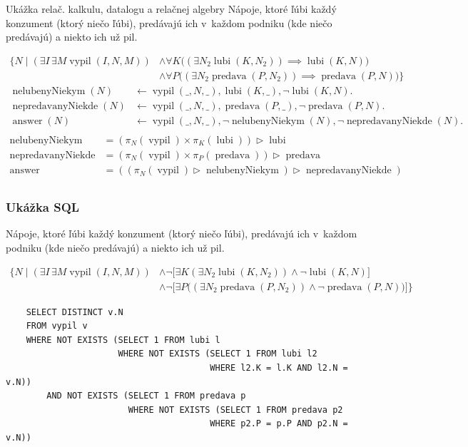 \documentclass[12pt]{beamer}
\DeclareMathOperator{\antijoin}{\rhd}
\DeclareMathOperator{\lubi}{lubi}
\DeclareMathOperator{\predava}{predava}
\DeclareMathOperator{\vypil}{vypil}
\DeclareMathOperator{\answer}{answer}
\begin{document}
\begin{frame}{Ukážka relač. kalkulu, datalogu a relačnej algebry}
Nápoje, ktoré ľúbi každý konzument (ktorý niečo ľúbi), predávajú ich v~každom podniku (kde niečo predávajú) a niekto ich už pil.

{\scriptsize
\begin{align*}
\Big\{N\mid (\exists I\,\exists M\vypil(I, N, M))&\land \forall K \Big( (\exists N_2\lubi(K, N_2))\implies \lubi(K, N)\Big)\\
&\land \forall P \Big((\exists N_2 \predava(P, N_2))\implies \predava(P, N)\Big)\Big\}
\end{align*}
}
{\scriptsize
\begin{align*}
\operatorname{nelubenyNiekym}(N) &\leftarrow \vypil(\_, N, \_), \lubi(K, \_), \lnot\lubi(K, N).\\
\operatorname{nepredavanyNiekde}(N) &\leftarrow \vypil(\_, N, \_), \predava(P, \_), \lnot\predava(P, N).\\
\answer(N) &\leftarrow \vypil(\_, N, \_), \lnot\operatorname{nelubenyNiekym}(N), \lnot\operatorname{nepredavanyNiekde}(N).\\
\end{align*}
}
\vskip -2mm
\vskip -2mm
{\scriptsize
\begin{align*}
\operatorname{nelubenyNiekym} & = (\pi_N(\vypil)\times \pi_K(\lubi))\antijoin \lubi\\
\operatorname{nepredavanyNiekde} & = (\pi_N(\vypil)\times \pi_P(\predava))\antijoin \predava\\
\answer & = ((\pi_N(\vypil) \antijoin \operatorname{nelubenyNiekym})\antijoin \operatorname{nepredavanyNiekde})\\
\end{align*}
}
\end{frame}

\begin{frame}[fragile]
\frametitle{Ukážka SQL}
Nápoje, ktoré ľúbi každý konzument (ktorý niečo ľúbi), predávajú ich v~každom podniku (kde niečo predávajú) a niekto ich už pil.

{\scriptsize
\begin{align*}
\Big\{N\mid (\exists I\,\exists M\vypil(I, N, M))&\land \lnot \Big[\exists K (\exists N_2\lubi(K, N_2))\land\lnot\lubi(K, N)\Big]\\
&\land \lnot\Big[\exists P \Big((\exists N_2 \predava(P, N_2))\land \lnot\predava(P, N)\Big)\Big]\Big\}
\end{align*}
}
\vskip -2mm
{\scriptsize
\begin{verbatim}
    SELECT DISTINCT v.N
    FROM vypil v
    WHERE NOT EXISTS (SELECT 1 FROM lubi l
                      WHERE NOT EXISTS (SELECT 1 FROM lubi l2
                                        WHERE l2.K = l.K AND l2.N = v.N))
        AND NOT EXISTS (SELECT 1 FROM predava p
                        WHERE NOT EXISTS (SELECT 1 FROM predava p2
                                        WHERE p2.P = p.P AND p2.N = v.N))
\end{verbatim}
}
\end{frame}
\end{document}

